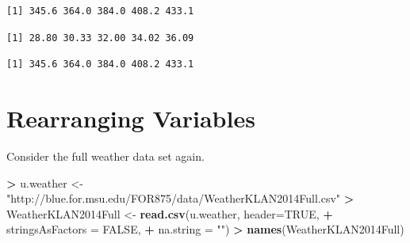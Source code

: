\documentclass[]{krantz}
\makeatletter
\newenvironment{Shaded}{\begin{snugshade}}{\end{snugshade}}
\newcommand{\DataTypeTok}[1]{\textcolor[rgb]{0.27,0.27,0.27}{#1}}
\newcommand{\DecValTok}[1]{\textcolor[rgb]{0.06,0.06,0.06}{#1}}
\newcommand{\KeywordTok}[1]{\textcolor[rgb]{0.27,0.27,0.27}{\textbf{#1}}}
\newcommand{\NormalTok}[1]{#1}
\newcommand{\OperatorTok}[1]{\textcolor[rgb]{0.43,0.43,0.43}{\textbf{#1}}}
\newcommand{\OtherTok}[1]{\textcolor[rgb]{0.37,0.37,0.37}{#1}}
\newcommand{\StringTok}[1]{\textcolor[rgb]{0.5,0.5,0.5}{#1}}
\newenvironment{kframe}{%
\medskip{}
\setlength{\fboxsep}{.8em}
 \def\at@end@of@kframe{}%
 \ifinner\ifhmode%
  \def\at@end@of@kframe{\end{minipage}}%
  \begin{minipage}{\columnwidth}%
 \fi\fi%
 \def\FrameCommand##1{\hskip\@totalleftmargin \hskip-\fboxsep
 \colorbox{shadecolor}{##1}\hskip-\fboxsep
     \hskip-\linewidth \hskip-\@totalleftmargin \hskip\columnwidth}%
 \MakeFramed {\advance\hsize-\width
   \@totalleftmargin\z@ \linewidth\hsize
   \@setminipage}}%
 {\par\unskip\endMakeFramed%
 \at@end@of@kframe}
\renewenvironment{Shaded}{\begin{kframe}}{\end{kframe}}
\makeatother
\begin{document}
\begin{verbatim}
[1] 345.6 364.0 384.0 408.2 433.1
\end{verbatim}

\begin{Shaded}
\end{Shaded}

\begin{verbatim}
[1] 28.80 30.33 32.00 34.02 36.09
\end{verbatim}

\begin{Shaded}
\end{Shaded}

\begin{verbatim}
[1] 345.6 364.0 384.0 408.2 433.1
\end{verbatim}

\hypertarget{rearranging-variables}{%
\section{Rearranging Variables}\label{rearranging-variables}}

Consider the full weather data set again.

\begin{Shaded}
\begin{Highlighting}[]
\OperatorTok{>}\StringTok{ }\NormalTok{u.weather <-}\StringTok{ "http://blue.for.msu.edu/FOR875/data/WeatherKLAN2014Full.csv"}
\OperatorTok{>}\StringTok{ }\NormalTok{WeatherKLAN2014Full <-}\StringTok{ }\KeywordTok{read.csv}\NormalTok{(u.weather, }\DataTypeTok{header=}\OtherTok{TRUE}\NormalTok{, }
\OperatorTok{+}\StringTok{                                 }\DataTypeTok{stringsAsFactors =} \OtherTok{FALSE}\NormalTok{,}
\OperatorTok{+}\StringTok{                                 }\DataTypeTok{na.string =} \StringTok{""}\NormalTok{)}
\OperatorTok{>}\StringTok{ }\KeywordTok{names}\NormalTok{(WeatherKLAN2014Full)}
\end{Highlighting}
\end{Shaded}
\end{document}
